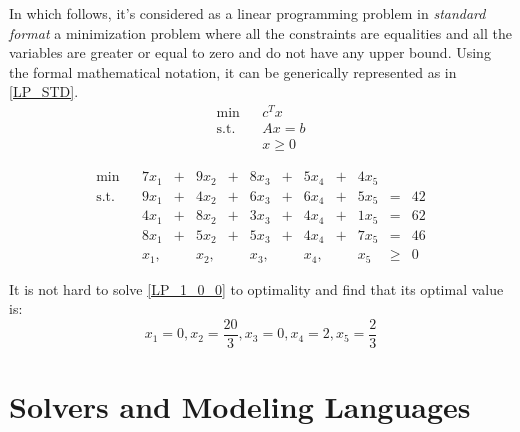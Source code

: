 \documentclass[12pt,hidelinks]{article}
\newcommand{\st}{\operatorname{s.t.}}
\begin{document}
		In which follows, it's considered as a linear programming problem in \emph{standard format} a minimization problem where all the constraints are equalities and all the variables are greater or equal to zero and do not have any upper bound. Using the formal mathematical notation, it can be generically represented as in \eqref{LP_STD}. 
		\begin{equation}\label{LP_STD}
			\begin{array}{llc}
				\min                & &  c^T x          \\
				\operatorname{s.t.} & &  Ax = b         \\
									& &   x \geqslant 0
			\end{array}
		\end{equation}

			\begin{equation}\label{LP_1_0_0}
				\begin{array}{llrcrcrcrcrcr}
				\min  & & 7x_1  & + & 9x_2  & + & 8x_3  & + & 5x_4  & + & 4x_5 &           &    \\
				\st   & & 9x_1  & + & 4x_2  & + & 6x_3  & + & 6x_4  & + & 5x_5 & =         & 42 \\
					  & & 4x_1  & + & 8x_2  & + & 3x_3  & + & 4x_4  & + & 1x_5 & =         & 62 \\
					  & & 8x_1  & + & 5x_2  & + & 5x_3  & + & 4x_4  & + & 7x_5 & =         & 46 \\
					  & &  x_1, &   &  x_2, &   &  x_3, &   &  x_4, &   &  x_5 & \geqslant & 0
				\end{array}
				\tag{LP1}
			\end{equation}

		It is not hard to solve \eqref{LP_1_0_0} to optimality and find that its optimal value is:
		$$x_1 = 0, x_2 = \frac{20}{3}, x_3 = 0, x_4 = 2, x_5 = \frac{2}{3}$$



\section{Solvers and Modeling Languages}
\vspace{10.5cm}
\end{document}
